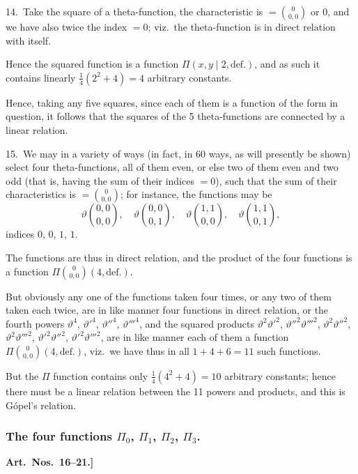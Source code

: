\documentclass[11pt,a4paper]{article}
\theoremstyle{definition}
\begin{document}
\medskip

14.\ Take the square of a theta-function, the characteristic is $= \binom{0}{0, 0}$ or $0$, and we have also twice the index $= 0$; viz.\ the theta-function is in direct relation with itself.

Hence the squared function is a function $\Pi(x, y \mid 2, \text{def.})$, and as such it contains linearly $\frac{1}{4}(2^2 + 4) = 4$ arbitrary constants.

Hence, taking any five squares, since each of them is a function of the form in question, it follows that the squares of the 5 theta-functions are connected by a linear relation.

\medskip

15.\ We may in a variety of ways (in fact, in 60 ways, as will presently be shown) select four theta-functions, all of them even, or else two of them even and two odd (that is, having the sum of their indices $= 0$), such that the sum of their characteristics is $= \binom{0}{0, 0}$; for instance, the functions may be
\[
\vartheta\binom{0,0}{0,0}, \quad \vartheta\binom{0,0}{0,1}, \quad \vartheta\binom{1,1}{0,0}, \quad \vartheta\binom{1,1}{0,1},
\]
indices $0$, $0$, $1$, $1$.

The functions are thus in direct relation, and the product of the four functions is a function $\Pi\binom{0}{0, 0}(4, \text{def.})$.

But obviously any one of the functions taken four times, or any two of them taken each twice, are in like manner four functions in direct relation, or the fourth powers $\vartheta^4$, $\vartheta'^4$, $\vartheta''^4$, $\vartheta'''^4$, and the squared products $\vartheta^2\vartheta'^2$, $\vartheta''^2\vartheta'''^2$, $\vartheta^2\vartheta''^2$, $\vartheta^2\vartheta'''^2$, $\vartheta'^2\vartheta''^2$, $\vartheta'^2\vartheta'''^2$, are in like manner each of them a function $\Pi\binom{0}{0, 0}(4, \text{def.})$, viz.\ we have thus in all $1 + 4 + 6 = 11$ such functions.

But the $\Pi$ function contains only $\frac{1}{4}(4^2 + 4) = 10$ arbitrary constants; hence there must be a linear relation between the 11 powers and products, and this is G\'{o}pel's relation.

\subsubsection*{The four functions $\Pi_0$, $\Pi_1$, $\Pi_2$, $\Pi_3$.}

\textbf{Art.~Nos.~16--21.]
}
\end{document}
